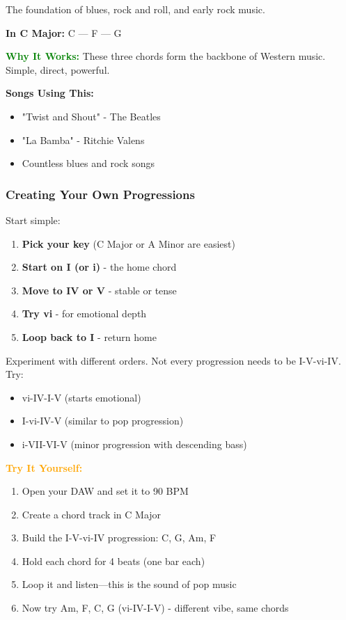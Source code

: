 \documentclass[11pt,letterpaper]{article}
\newcommand{\greentext}[1]{\textcolor{green}{\textbf{#1}}}
\newcommand{\orangetext}[1]{\textcolor{orange}{\textbf{#1}}}
\begin{document}
The foundation of blues, rock and roll, and early rock music.

\textbf{In C Major:} C — F — G

\textbf{\greentext{Why It Works:}} These three chords form the backbone of Western music. Simple, direct, powerful.

\textbf{Songs Using This:}
\begin{itemize}[leftmargin=*]
\item "Twist and Shout" - The Beatles
\item "La Bamba" - Ritchie Valens
\item Countless blues and rock songs
\end{itemize}

\subsubsection{Creating Your Own Progressions}

Start simple:

\begin{enumerate}[leftmargin=*]
\item \textbf{Pick your key} (C Major or A Minor are easiest)
\item \textbf{Start on I (or i)} - the home chord
\item \textbf{Move to IV or V} - stable or tense
\item \textbf{Try vi} - for emotional depth
\item \textbf{Loop back to I} - return home
\end{enumerate}

Experiment with different orders. Not every progression needs to be I-V-vi-IV. Try:
\begin{itemize}[leftmargin=*]
\item vi-IV-I-V (starts emotional)
\item I-vi-IV-V (similar to pop progression)
\item i-VII-VI-V (minor progression with descending bass)
\end{itemize}

\textbf{\orangetext{Try It Yourself:}}

\begin{enumerate}[leftmargin=*]
\item Open your DAW and set it to 90 BPM
\item Create a chord track in C Major
\item Build the I-V-vi-IV progression: C, G, Am, F
\item Hold each chord for 4 beats (one bar each)
\item Loop it and listen—this is the sound of pop music
\item Now try Am, F, C, G (vi-IV-I-V) - different vibe, same chords
\end{enumerate}
\end{document}
